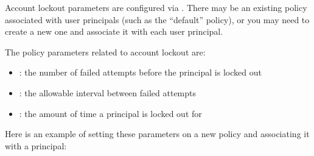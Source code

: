 \documentclass[letterpaper,10pt,english]{sphinxmanual}
\begin{document}
\begin{sphinxVerbatim}[commandchars=\\\{\}]
    
\end{sphinxVerbatim}

\sphinxAtStartPar
Account lockout parameters are configured via {\hyperref[\detokenize{admin/database:policies}]{}}.  There may be an existing policy associated with user
principals (such as the “default” policy), or you may need to create a
new one and associate it with each user principal.

\sphinxAtStartPar
The policy parameters related to account lockout are:
\begin{itemize}
\item {} 
\sphinxAtStartPar
{\hyperref[\detokenize{admin/admin_commands/kadmin_local:policy-maxfailure}]{}}: the number of failed attempts
before the principal is locked out

\item {} 
\sphinxAtStartPar
{\hyperref[\detokenize{admin/admin_commands/kadmin_local:policy-failurecountinterval}]{}}: the
allowable interval between failed attempts

\item {} 
\sphinxAtStartPar
{\hyperref[\detokenize{admin/admin_commands/kadmin_local:policy-lockoutduration}]{}}: the amount of time
a principal is locked out for

\end{itemize}

\sphinxAtStartPar
Here is an example of setting these parameters on a new policy and
associating it with a principal:

\begin{sphinxVerbatim}[commandchars=\\\{\}]
     
      
    
\end{sphinxVerbatim}
\end{document}
